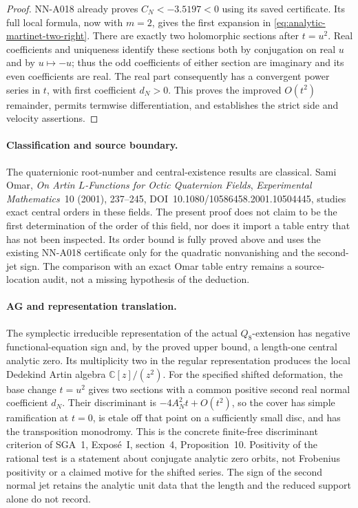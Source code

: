 \begin{proof}
NN-A018 already proves $C_N<-3.5197<0$ using its saved
certificate. Its full local formula, now with $m=2$, gives
the first expansion in \eqref{eq:analytic-martinet-two-right}.
There are exactly two holomorphic sections after $t=u^2$.
Real coefficients and uniqueness identify these sections both
by conjugation on real $u$ and by $u\mapsto-u$; thus the odd
coefficients of either section are imaginary and its even
coefficients are real. The real part consequently has a
convergent power series in $t$, with first coefficient
$d_N>0$. This proves the improved $O(t^2)$ remainder, permits
termwise differentiation, and establishes the strict side and
velocity assertions.
\end{proof}

\paragraph{Classification and source boundary.}
The quaternionic root-number and central-existence results are
classical. Sami Omar, \emph{On Artin $L$-Functions for Octic
Quaternion Fields}, \emph{Experimental Mathematics}~10 (2001),
237--245, DOI~10.1080/10586458.2001.10504445, studies exact
central orders in these fields. The present proof does not
claim to be the first determination of the order of this field,
nor does it import a table entry that has not been inspected.
Its order bound is fully proved above and uses the existing
NN-A018 certificate only for the quadratic nonvanishing and
the second-jet sign. The comparison with an exact Omar table
entry remains a source-location audit, not a missing hypothesis
of the deduction.

\paragraph{AG and representation translation.}
The symplectic irreducible representation of the actual
$Q_8$-extension has negative functional-equation sign and,
by the proved upper bound, a length-one central analytic zero.
Its multiplicity two in the regular representation produces
the local Dedekind Artin algebra $\mathbb C[z]/(z^2)$. For the
specified shifted deformation, the base change $t=u^2$ gives
two sections with a common positive second real normal
coefficient $d_N$. Their discriminant is
$-4A_N^2t+O(t^2)$, so the cover has simple ramification at
$t=0$, is etale off that point on a sufficiently small disc,
and has the transposition monodromy. This is the concrete
finite-free discriminant criterion of SGA~1, Expos\'e~I,
section~4, Proposition~10. Positivity of the rational test is
a statement about conjugate analytic zero orbits, not
Frobenius positivity or a claimed motive for the shifted
series. The sign of the second normal jet retains the analytic
unit data that the length and the reduced support alone do not
record.


